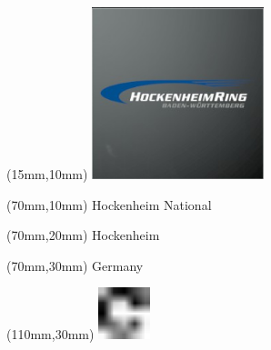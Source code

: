 \null\newpage
\begin{textblock*}{50mm}(15mm,10mm)%
\includegraphics[width=50mm]{LG/2015-05-20_00082.png}
\end{textblock*}
\begin{textblock*}{130mm}(70mm,10mm)%
{\fontsize{20}{20}\selectfont Hockenheim National}\\
\end{textblock*}
\begin{textblock*}{120mm}(70mm,20mm)%
{\fontsize{16}{16}\selectfont Hockenheim}\\
\end{textblock*}
\begin{textblock*}{120mm}(70mm,30mm)%
{\fontsize{12}{12}\selectfont Germany}
\end{textblock*}
\begin{textblock*}{30mm}(110mm,30mm)%
\centering
\includegraphics[height=15mm]{icons/fa-rotate-right.pdf}
\end{textblock*}
